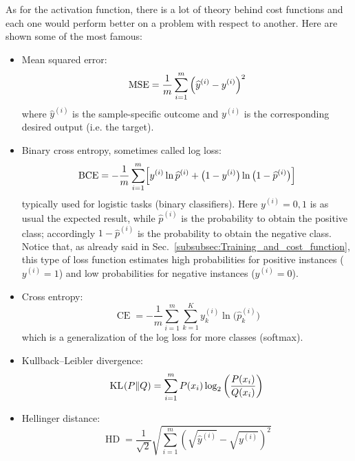 As for the activation function, there is a lot of theory behind cost functions and each one would perform better on a problem with respect to another. Here are shown some of the most famous:
\begin{itemize}
\item Mean squared error:
\begin{equation}
\operatorname{MSE}=\frac{1}{m}\sum_{i=1}^m{\Bigl(\widehat{y}^{(i)}-y^{(i)}\Bigr)}^2
\end{equation}
where $\widehat{y}^{(i)}$ is the sample-specific outcome and $y^{(i)}$ is the corresponding desired output (i.e. the target).
\item Binary cross entropy, sometimes called log loss:
\begin{equation}
\operatorname{BCE}=-\frac{1}{m}\sum_{i=1}^m\Bigl[y^{(i)}\ln{\widehat{p}^{(i)}}+\bigl(1-y^{(i)}\bigr)\ln{\bigl(1-\widehat{p}^{(i)}\bigr)}\Bigr]
\end{equation}
typically used for logistic tasks (binary classifiers). Here $y^{(i)}=0,1$ is as usual the expected result, while $\widehat{p}^{(i)}$ is the probability to obtain the positive class; accordingly $1-\widehat{p}^{(i)}$ is the probability to obtain the negative class. Notice that, as already said in Sec.~\ref{subsubsec:Training_and_cost_function}, this type of loss function estimates high probabilities for positive instances ($y^{(i)}=1$) and low probabilities for negative instances ($y^{(i)}=0$).
\item Cross entropy:
\begin{equation}
\operatorname{CE}=-\frac{1}{m}\sum_{i=1}^m\sum_{k=1}^Ky_k^{(i)}\ln{\bigl(\widehat{p}_k^{(i)}\bigr)}
\end{equation}
which is a generalization of the log loss for more classes (softmax).
\item Kullback--Leibler divergence:
\begin{equation}
\operatorname{KL}\mspace{1mu}(P\mathord{\parallel}Q)=\sum_{i=1}^mP(x_i)\log_2{\left(\frac{P(x_i)}{Q(x_i)}\right)}
\end{equation}
\item Hellinger distance:
\begin{equation}
\operatorname{HD}=\frac{1}{\sqrt{2}}\sqrt{\sum_{i=1}^m{\left(\sqrt{\widehat{y}^{(i)}}-\sqrt{y^{(i)}}\right)}^2}
\end{equation}
\end{itemize}
